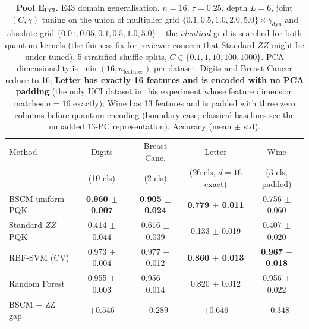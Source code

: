 \documentclass[pdflatex,sn-mathphys]{sn-jnl}
\theoremstyle{plain}
\theoremstyle{remark}
\theoremstyle{definition}
\begin{document}
\begin{table}[htbp]
\caption{\textbf{Pool E$_\text{UCI}$.} E43 domain generalisation. $n=16$, $\tau=0.25$, depth $L=6$, joint $(C, \gamma)$ tuning on the union of multiplier grid $\{0.1, 0.5, 1.0, 2.0, 5.0\}\times\gamma_\text{dyn}$ and absolute grid $\{0.01, 0.05, 0.1, 0.5, 1.0, 5.0\}$ -- the \emph{identical} grid is searched for both quantum kernels (the fairness fix for reviewer concern that Standard-$ZZ$ might be under-tuned).  5 stratified shuffle splits, $C \in \{0.1, 1, 10, 100, 1000\}$.  PCA dimensionality is $\min(16, n_{\text{features}})$ per dataset: Digits and Breast Cancer reduce to 16; \textbf{Letter has exactly 16 features and is encoded with no PCA padding} (the only UCI dataset in this experiment whose feature dimension matches $n=16$ exactly); Wine has 13 features and is padded with three zero columns before quantum encoding (boundary case; classical baselines see the unpadded 13-PC representation).  Accuracy (mean $\pm$ std).}
\label{tab:e43}
\setlength{\tabcolsep}{4pt}
\begin{tabular}{@{}lcccc@{}}
\toprule
Method & Digits & Breast Canc. & Letter & Wine \\
       & (10 cls) & (2 cls) & (26 cls, $d\!=\!16$ exact) & (3 cls, padded) \\
\midrule
BSCM-uniform-PQK   & \textbf{0.960 $\pm$ 0.007} & \textbf{0.905 $\pm$ 0.024} & \textbf{0.779 $\pm$ 0.011} & 0.756 $\pm$ 0.060 \\
Standard-$ZZ$-PQK  & 0.414 $\pm$ 0.044 & 0.616 $\pm$ 0.039 & 0.133 $\pm$ 0.019 & 0.407 $\pm$ 0.020 \\
RBF-SVM (CV)       & 0.973 $\pm$ 0.004 & 0.977 $\pm$ 0.012 & \textbf{0.860 $\pm$ 0.013} & \textbf{0.967 $\pm$ 0.018} \\
Random Forest      & 0.955 $\pm$ 0.003 & 0.956 $\pm$ 0.014 & 0.820 $\pm$ 0.012 & 0.956 $\pm$ 0.022 \\
\midrule
BSCM $-$ ZZ gap    & $+0.546$           & $+0.289$           & $+0.646$           & $+0.348$ \\
\bottomrule
\end{tabular}
\end{table}
\end{document}

